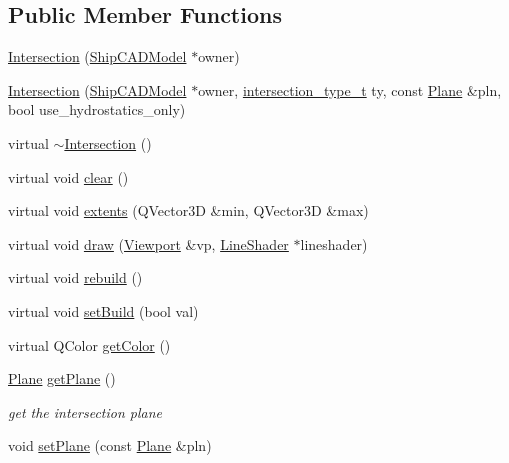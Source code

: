 \subsection*{Public Member Functions}
\begin{DoxyCompactItemize}
\item 
\hyperlink{classShipCAD_1_1Intersection_acde7d35483e1e4ee56ecf75eb7a70f66}{Intersection} (\hyperlink{classShipCAD_1_1ShipCADModel}{Ship\+C\+A\+D\+Model} $\ast$owner)
\item 
\hyperlink{classShipCAD_1_1Intersection_a3a4f17fe81289d26d2ec329dd9db5c69}{Intersection} (\hyperlink{classShipCAD_1_1ShipCADModel}{Ship\+C\+A\+D\+Model} $\ast$owner, \hyperlink{namespaceShipCAD_aa56834b730aafdf2786ddc9a60a046fd}{intersection\+\_\+type\+\_\+t} ty, const \hyperlink{classShipCAD_1_1Plane}{Plane} \&pln, bool use\+\_\+hydrostatics\+\_\+only)
\item 
virtual \hyperlink{classShipCAD_1_1Intersection_a017d0a1000ca2e9eca3537def58b3988}{$\sim$\+Intersection} ()
\item 
virtual void \hyperlink{classShipCAD_1_1Intersection_a2163245dc7153d1590811ab2902d6ee4}{clear} ()
\item 
virtual void \hyperlink{classShipCAD_1_1Intersection_af751d515708531ca098321840a92c47b}{extents} (Q\+Vector3D \&min, Q\+Vector3D \&max)
\item 
virtual void \hyperlink{classShipCAD_1_1Intersection_a9e346019a52aa0540628b75994ea94a5}{draw} (\hyperlink{classShipCAD_1_1Viewport}{Viewport} \&vp, \hyperlink{classShipCAD_1_1LineShader}{Line\+Shader} $\ast$lineshader)
\item 
virtual void \hyperlink{classShipCAD_1_1Intersection_aed30bdca43037f72b85c4d53e234fd6c}{rebuild} ()
\item 
virtual void \hyperlink{classShipCAD_1_1Intersection_a2b496f9ab21c5fc4a7b97a665b24f2b1}{set\+Build} (bool val)
\item 
virtual Q\+Color \hyperlink{classShipCAD_1_1Intersection_acae07360e9ccef12a498332ac6dbedd9}{get\+Color} ()
\item 
\hyperlink{classShipCAD_1_1Plane}{Plane} \hyperlink{classShipCAD_1_1Intersection_ac0b838a811f8df5c2fa0b0ea44ba4bb7}{get\+Plane} ()
\begin{DoxyCompactList}\small\item\em get the intersection plane \end{DoxyCompactList}\item 
void \hyperlink{classShipCAD_1_1Intersection_a72f2a58ec72cd3a38cf0d59a84650fb5}{set\+Plane} (const \hyperlink{classShipCAD_1_1Plane}{Plane} \&pln)

\end{DoxyCompactItemize}

